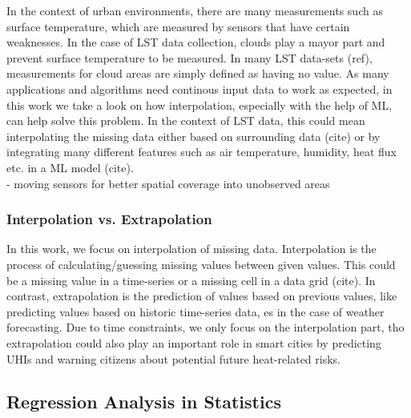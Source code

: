 
In the context of urban environments, there are many measurements such as surface temperature, which are measured by sensors that have certain weaknesses. In the case of LST data collection, clouds play a mayor part and prevent surface temperature to be measured. In many LST data-sets (ref), measurements for cloud areas are simply defined as having no value. As many applications and algorithms need continous input data to work as expected, in this work we take a look on how interpolation, especially with the help of ML, can help solve this problem. In the context of LST data, this could mean interpolating the missing data either based on surrounding data (cite) or by integrating many different features such as air temperature, humidity, heat flux etc. in a ML model (cite).\\
- moving sensors for better spatial coverage into unobserved areas

\subsubsection{Interpolation vs. Extrapolation}

In this work, we focus on interpolation of missing data. Interpolation is the process of calculating/guessing missing values between given values. This could be a missing value in a time-series or a missing cell in a data grid (cite). In contrast, extrapolation is the prediction of values based on previous values, like predicting values based on historic time-series data, es in the case of weather forecasting. Due to time constraints, we only focus on the interpolation part, tho extrapolation could also play an important role in smart cities by predicting UHIs and warning citizens about potential future heat-related risks.

\subsection{Regression Analysis in Statistics}

